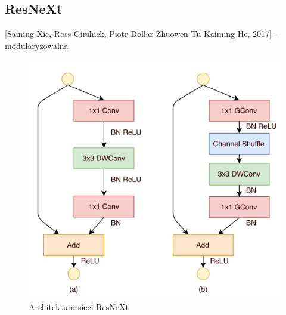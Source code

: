 \documentclass[12pt,a4paper,twoside,titlepage,openright]{book}
\begin{document}
{\subsection{ResNeXt}
[Saining Xie, Ross Girshick, Piotr Dollar Zhuowen Tu Kaiming He, 2017] - modularyzowalna 
\cite{DBLP:journals/corr/XieGDTH16}
\begin{figure}[h]
	\centering
			\includegraphics[resolution=120]{ResNeXt.png}
		\caption{Architektura sieci ResNeXt}
\end{figure}

}
\end{document}
